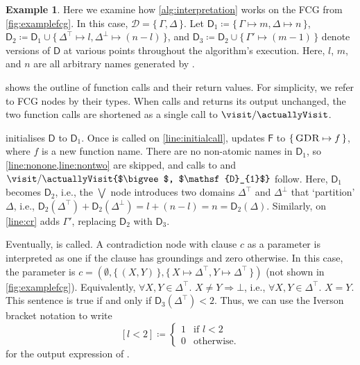 \documentclass{article}
\theoremstyle{definition}
\newtheorem{example}{Example}
\theoremstyle{remark}
\newcommand{\Done}{\mathsf{D}_{1}}
\newcommand{\Dtwo}{\mathsf{D}_{2}}
\newcommand{\Dthree}{\mathsf{D}_{3}}
\DeclareMathOperator{\CR}{\textsc{CR}}
\DeclareMathOperator{\GDR}{\textsc{GDR}}
\begin{document}
\begin{example}\label{example:interpretation}
  Here we examine how \cref{alg:interpretation} works on the FCG from
  \cref{fig:examplefcg}. In this case, $\mathcal{D} = \{\, \Gamma, \Delta \,\}$.
  Let $\Done \coloneqq \{\, \Gamma \mapsto m, \Delta \mapsto n \,\}$,
  $\Dtwo \coloneqq \Done \cup \{\, \Delta^{\top} \mapsto l, \Delta^{\bot} \mapsto (n-l) \,\}$,
  and $\Dthree \coloneqq \Dtwo \cup \{\, \Gamma' \mapsto (m-1) \,\}$ denote
  versions of $\mathsf{D}$ at various points throughout the algorithm's
  execution. Here, $l$, $m$, and $n$ are all arbitrary names generated by
  \newDomainName.

   shows the outline of function calls and their return
  values. For simplicity, we refer to FCG nodes by their types. When \visit
  calls \actuallyVisit and returns its output unchanged, the two function calls
  are shortened as a single call to $\visit/\actuallyVisit$.

   initialises $\mathsf{D}$ to $\Done$. Once \visit{$\GDR$,
    $\Done$} is called on \cref{line:initialcall}, \newFunctionName updates
  $\mathsf{F}$ to $\{\, \GDR \mapsto f \,\}$, where $f$ is a new function name.
  There are no non-atomic names in $\Done$, so \cref{line:nonone,line:nontwo}
  are skipped, and calls to \actuallyVisit{$\GDR$, $\Done$} and
  $\visit/\actuallyVisit{$\bigvee$, $\Done$}$ follow. Here, $\Done$ becomes
  $\Dtwo$, i.e., the $\bigvee$ node introduces two domains $\Delta^{\top}$ and
  $\Delta^{\bot}$ that `partition' $\Delta$, i.e.,
  $\Dtwo(\Delta^{\top}) + \Dtwo(\Delta^{\bot}) = l + (n-l) = n = \Dtwo(\Delta)$.
  Similarly, \actuallyVisit{$\CR$, $\Dtwo$} on \cref{line:cr} adds $\Gamma'$,
  replacing $\Dtwo$ with $\Dthree$.

  Eventually, \actuallyVisit{$\bot$, $\Dthree$} is called. A contradiction node
  with clause $c$ as a parameter is interpreted as one if the clause has
  groundings and zero otherwise. In this case, the parameter is
  $c = (\emptyset, \{\, (X, Y) \,\}, \{\, X \mapsto \Delta^\top, Y \mapsto \Delta^\top \,\})$
  (not shown in \cref{fig:examplefcg}). Equivalently,
  $\forall X, Y \in \Delta^{\top}\text{. }X \ne Y \Rightarrow \bot$, i.e.,
  $\forall X, Y \in \Delta^{\top}\text{. }X = Y$. This sentence is true if and
  only if $\Dthree(\Delta^{\top}) < 2$. Thus, we can use the Iverson bracket
  notation to write
  \[
    [l < 2] \coloneqq
    \begin{cases}
      1 & \text{if } l < 2 \\
      0 & \text{otherwise.}
    \end{cases}
  \]
  for the output expression of \actuallyVisit{$\bot$, $\Dthree$}.


\end{example}
\end{document}
